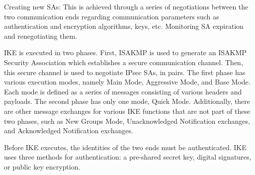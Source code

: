 \begin{outline}
\1 Creating new SAs: This is achieved through a series of negotiations between the two communication ends regarding communication parameters such as authentication and encryption algorithms, keys, etc.
\1 Monitoring SA expiration and renegotiating them.
\end{outline}

IKE is executed in two phases. First, ISAKMP is used to generate an ISAKMP Security Association which establishes a secure communication channel. Then, this secure channel is used to negotiate IPsec SAs, in pairs. The first phase has various execution modes, namely Main Mode, Aggressive Mode, and Base Mode. Each mode is defined as a series of messages consisting of various headers and payloads. The second phase has only one mode, Quick Mode. Additionally, there are other message exchanges for various IKE functions that are not part of these two phases, such as New Groups Mode, Unacknowledged Notification exchanges, and Acknowledged Notification exchanges.

Before IKE executes, the identities of the two ends must be authenticated. IKE uses three methods for authentication: a pre-shared secret key, digital signatures, or public key encryption.

